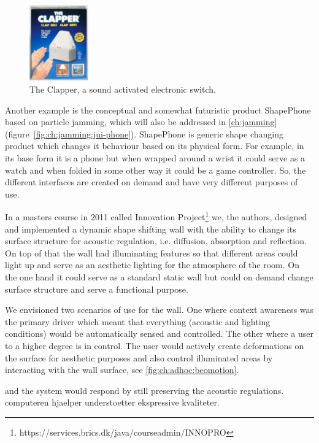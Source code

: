 \begin{figure}[hb]
	\centering
  		\includegraphics[width=1in]{figures/theclapper}
	\caption[The Clapper, a sound activated electronic switch.]
   {The Clapper, a sound activated electronic switch.}
   \label{ch:adhoc:theclapper}
\end{figure}

Another example is the conceptual and somewhat futuristic product ShapePhone based on particle jamming, which will also be addressed in \autoref{ch:jamming}(figure~\ref{fig:ch:jamming:jui-phone}).
ShapePhone is generic shape changing product which changes it behaviour based on its physical form.
For example, in its base form it is a phone but when wrapped around a wrist it could serve as a watch and when folded in some other way it could be a game controller.
So, the different interfaces are created on demand and have very different purposes of use.

In a masters course in 2011 called Innovation Project\footnote{https://services.brics.dk/java/courseadmin/INNOPRO} we, the authors, designed and implemented a dynamic shape shifting wall with the ability to change its surface structure for acoustic regulation, i.e. diffusion, absorption and reflection.
On top of that the wall had illuminating features so that different areas could light up and serve as an aesthetic lighting for the atmosphere of the room. 
On the one hand it could serve as a standard static wall but could on demand change surface structure and serve a functional purpose.

We envisioned two scenarios of use for the wall.
One where context awareness was the primary driver which meant that everything (acoustic and lighting conditions) would be automatically sensed and controlled.
The other where a user to a higher degree is in control.
The user would actively create deformations on the surface for aesthetic purposes and also control illuminated areas by interacting with the wall surface, see \ref{fig:ch:adhoc:beomotion}.

and the system would respond by still preserving the acoustic regulations.
computeren hjaelper understoetter
ekspressive kvaliteter.

